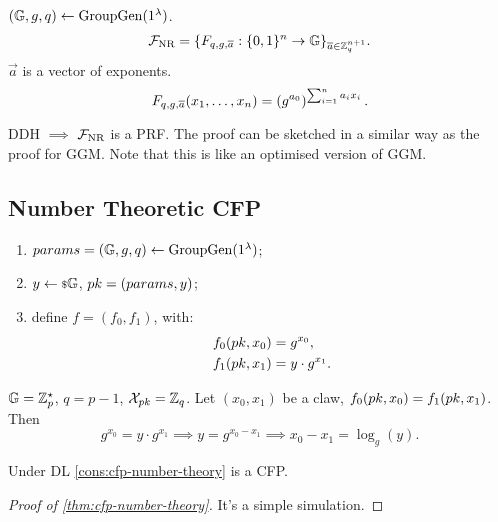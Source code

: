 \begin{construction}
	$\GroupGen$.
	\begin{equation*}
		\F_{\text{NR}} = \{ F_{q,g,\vec{a}} : \{0,1\}^{n} \to \Group \}_{\vec{a} \in \Integers_q^{n+1}}.
	\end{equation*}
	$\vec{a}$ is a vector of exponents.
	\begin{equation*}
		F_{q,g,\vec{a}}(x_1, \dots, x_n) = \left( g^{a_0} \right)^{\sum_{i=1}^{n} a_i x_i}. \qedhere
	\end{equation*}
\end{construction}
\ac{DDH} $\implies$ $\F_{\text{NR}}$ is a \ac{PRF}.
The proof can be sketched in a similar way as the proof for \ac{GGM}.
Note that this is like an optimised version of \ac{GGM}.

\subsection{Number Theoretic \acl{CFP}}

\begin{construction} \label{cons:cfp-number-theory}
	\begin{enumerate}
		\item $\params = \GroupGen$;
		\item $y \rand{\Group}$, $\pk = (\params, y)$;
		\item define $f = (f_0, f_1)$, with:
			\begin{align*}
				f_0(\pk, x_0) & = g^{x_0}, \\
				f_1(\pk, x_1) & = y \cdot g^{x_1}.
			\end{align*}
	\end{enumerate}
\end{construction}
$\Group = \Integers_p^{\star}$, $q = p-1$, $\X_{\pk} = \Integers_q$.
Let $(x_0, x_1)$ be a claw, \ie $f_0(\pk, x_0) = f_1(\pk, x_1)$.
Then
\begin{equation*}
	g^{x_0} = y \cdot g^{x_1} \implies y = g^{x_0 - x_1} \implies x_0 - x_1 = \log_g(y).
\end{equation*}

\begin{theorem} \label{thm:cfp-number-theory}
	Under \ac{DL} \cref{cons:cfp-number-theory} is a \ac{CFP}.
\end{theorem}

\begin{proof}[Proof of \cref{thm:cfp-number-theory}]
	It's a simple simulation.
\end{proof}


